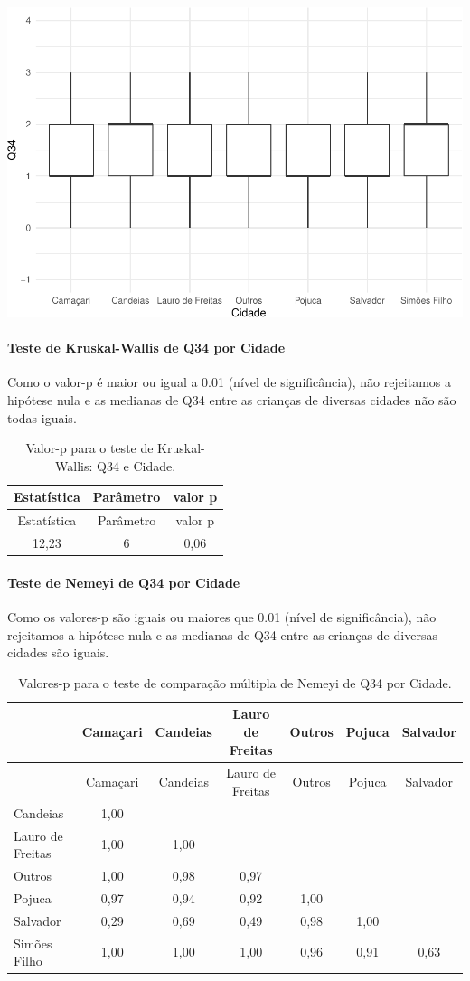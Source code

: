 \documentclass[]{article}
\let\oldparagraph\paragraph
\renewcommand{\paragraph}[1]{\oldparagraph{#1}\mbox{}}
\begin{document}
\begin{center}\includegraphics[width=0.75\linewidth]{relatorio_covid19_files/figure-latex/unnamed-chunk-1197-1} \end{center}

\hypertarget{teste-de-kruskal-wallis-de-q34-por-cidade}{%
\paragraph{Teste de Kruskal-Wallis de Q34 por Cidade}\label{teste-de-kruskal-wallis-de-q34-por-cidade}}

Como o valor-p é maior ou igual a 0.01 (nível de significância), não rejeitamos a hipótese nula e as medianas de Q34 entre as crianças de diversas cidades não são todas iguais.

\begin{longtable}[]{@{}ccc@{}}
\caption{\label{tab:unnamed-chunk-1199}Valor-p para o teste de Kruskal-Wallis: Q34 e Cidade.}\tabularnewline
\toprule
Estatística & Parâmetro & valor p\tabularnewline
\midrule
\endfirsthead
\toprule
Estatística & Parâmetro & valor p\tabularnewline
\midrule
\endhead
12,23 & 6 & 0,06\tabularnewline
\bottomrule
\end{longtable}

\hypertarget{teste-de-nemeyi-de-q34-por-cidade}{%
\paragraph{Teste de Nemeyi de Q34 por Cidade}\label{teste-de-nemeyi-de-q34-por-cidade}}

Como os valores-p são iguais ou maiores que 0.01 (nível de significância), não rejeitamos a hipótese nula e as medianas de Q34 entre as crianças de diversas cidades são iguais.

\begin{longtable}[]{@{}lcccccc@{}}
\caption{\label{tab:unnamed-chunk-1201}Valores-p para o teste de comparação múltipla de Nemeyi de Q34 por Cidade.}\tabularnewline
\toprule
& Camaçari & Candeias & Lauro de Freitas & Outros & Pojuca & Salvador\tabularnewline
\midrule
\endfirsthead
\toprule
& Camaçari & Candeias & Lauro de Freitas & Outros & Pojuca & Salvador\tabularnewline
\midrule
\endhead
Candeias & 1,00 & & & & &\tabularnewline
Lauro de Freitas & 1,00 & 1,00 & & & &\tabularnewline
Outros & 1,00 & 0,98 & 0,97 & & &\tabularnewline
Pojuca & 0,97 & 0,94 & 0,92 & 1,00 & &\tabularnewline
Salvador & 0,29 & 0,69 & 0,49 & 0,98 & 1,00 &\tabularnewline
Simões Filho & 1,00 & 1,00 & 1,00 & 0,96 & 0,91 & 0,63\tabularnewline
\bottomrule
\end{longtable}
\end{document}
